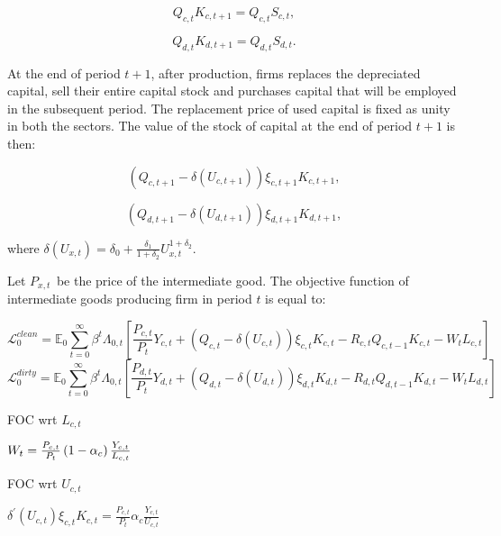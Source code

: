 \documentclass{article}
\begin{document}
\begin{equation*}
Q_{c,t}K_{c,t+1}=Q_{c,t}S_{c,t},
\end{equation*}

\begin{equation*}
Q_{d,t}K_{d,t+1}=Q_{d,t}S_{d,t}.
\end{equation*}

At the end of period $t+1$, after production, firms replaces the depreciated
capital, sell their entire capital stock and purchases capital that will be
employed in the subsequent period. The replacement price of used capital is
fixed as unity in both the sectors. The value of the stock of capital at the
end of period $t+1$ is then:

\begin{equation*}
\left( Q_{c,t+1}-\delta \left( U_{c,t+1}\right) \right) \xi
_{c,t+1}K_{c,t+1},
\end{equation*}

\begin{equation*}
\left( Q_{d,t+1}-\delta \left( U_{d,t+1}\right) \right) \xi
_{d,t+1}K_{d,t+1},
\end{equation*}

where $\delta (U_{x,t})=\delta _{0}+\frac{\delta _{1}}{1+\delta _{2}}%
U_{x,t}^{1+\delta _{2}}$.

Let $P_{x,t\text{ }}$be the price of the intermediate good. The objective
function of intermediate goods producing firm in period $t$ is equal to:

\begin{equation*}
\mathcal{L}_{0}^{clean}=\mathbb{E}_{0}\sum_{t=0}^{\infty }\beta ^{t}\Lambda
_{0,t}\left[ \frac{P_{c,t}}{P_{t}}Y_{c,t}+\left( Q_{c,t}-\delta
(U_{c,t})\right) \xi _{c,t}K_{c,t}-R_{c,t}Q_{c,t-1}K_{c,t}-W_{t}L_{c,t}%
\right]
\end{equation*}%
\begin{equation*}
\mathcal{L}_{0}^{dirty}=\mathbb{E}_{0}\sum_{t=0}^{\infty }\beta ^{t}\Lambda
_{0,t}\left[ \frac{P_{d,t}}{P_{t}}Y_{d,t}+\left( Q_{d,t}-\delta
(U_{d,t})\right) \xi _{d,t}K_{d,t}-R_{d,t}Q_{d,t-1}K_{d,t}-W_{t}L_{d,t}%
\right]
\end{equation*}

FOC wrt $L_{c,t}$

$W_{t}=\frac{P_{c,t}}{P_{t}}\left( 1-\alpha _{c}\right) \frac{Y_{c,t}}{%
L_{c,t}}$

FOC wrt $U_{c,t}$

\bigskip $\delta ^{\prime }(U_{c,t})\xi _{c,t}K_{c,t}=\frac{P_{c,t}}{P_{t}}%
\alpha _{c}\frac{Y_{c,t}}{U_{c,t}}$
\end{document}
